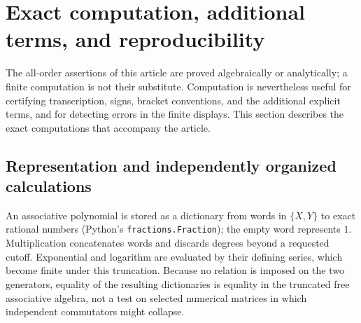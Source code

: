 \section{Exact computation, additional terms, and reproducibility}\label{sec:computation}
The all-order assertions of this article are proved algebraically or
analytically; a finite computation is not their substitute. Computation is
nevertheless useful for certifying transcription, signs, bracket
conventions, and the additional explicit terms, and for detecting errors in
the finite displays. This section describes the exact computations that
accompany the article.

\subsection{Representation and independently organized calculations}
An associative polynomial is stored as a dictionary from words in $\{X,Y\}$
to exact rational numbers (Python's \texttt{fractions.Fraction}); the empty
word represents $1$. Multiplication concatenates words and discards
degrees beyond a requested cutoff. Exponential and logarithm are evaluated
by their defining series, which become finite under this truncation.
Because no relation is imposed on the two generators, equality of the
resulting dictionaries is equality in the truncated free associative
algebra, not a test on selected numerical matrices in which independent
commutators might collapse.


